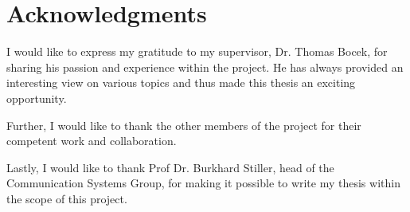 \chapter*{Acknowledgments}

I would like to express my gratitude to my supervisor, Dr. Thomas Bocek, for sharing his passion and experience within the project. He has always provided an interesting view on various topics and thus made this thesis an exciting opportunity.

Further, I would like to thank the other members of the project for their competent work and collaboration.

Lastly, I would like to thank Prof Dr. Burkhard Stiller, head of the Communication Systems Group, for making it possible to write my thesis within the scope of this project.
